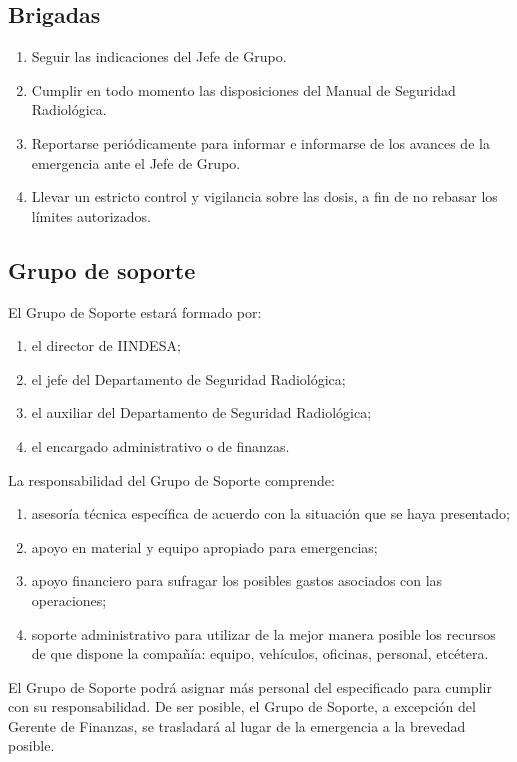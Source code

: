 \subsection{Brigadas}
\begin{enumerate}
  \item Seguir las indicaciones del Jefe de Grupo.
  \item Cumplir en todo momento las disposiciones del Manual de Seguridad Radiológica.
  \item Reportarse periódicamente para informar e informarse de los avances de la emergencia ante el Jefe de Grupo.
  \item Llevar un estricto control y vigilancia sobre las dosis, a fin de no rebasar los límites autorizados.
\end{enumerate}

\subsection{Grupo de soporte}

El Grupo de Soporte estará formado por:
\begin{enumerate}[label=\roman*.]
  \item el director de IINDESA;
  \item el jefe del Departamento de Seguridad Radiológica;
  \item el auxiliar del Departamento de Seguridad Radiológica;
  \item el encargado administrativo o de finanzas.
\end{enumerate}

La responsabilidad del Grupo de Soporte comprende:
\begin{enumerate}
  \item asesoría técnica específica de acuerdo con la situación que se haya presentado;
  \item apoyo en material y equipo apropiado para emergencias;
  \item apoyo financiero para sufragar los posibles gastos asociados con las operaciones;
  \item soporte administrativo para utilizar de la mejor manera posible los recursos de que dispone la compañía: equipo, vehículos, oficinas, personal, etcétera.
\end{enumerate}

El Grupo de Soporte podrá asignar más personal del especificado para cumplir con su responsabilidad. De ser posible, el Grupo de Soporte, a excepción del Gerente de Finanzas, se trasladará al lugar de la emergencia a la brevedad posible.

